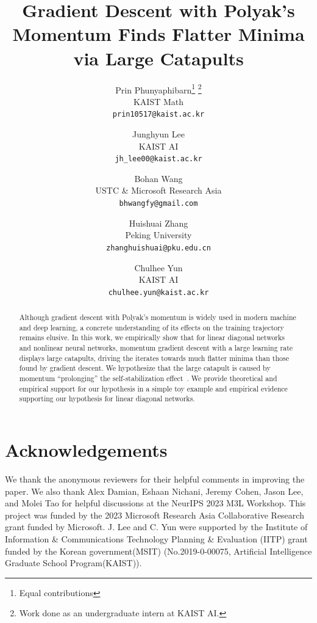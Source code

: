\documentclass{article}
\title{\textbf{Gradient Descent with Polyak's Momentum Finds Flatter Minima via Large Catapults}}
\date{}
\author{
  Prin Phunyaphibarn\thanks{Equal contributions} \thanks{Work done as an undergraduate intern at KAIST AI.} \\
  KAIST Math\\
  \texttt{\small prin10517@kaist.ac.kr} \\
  \and
  Junghyun Lee\footnotemark[1] \\
  KAIST AI\\
  \texttt{\small jh\_lee00@kaist.ac.kr} \\
  \and
  Bohan Wang \\
  USTC \& Microsoft Research Asia\\
  \texttt{\small bhwangfy@gmail.com} \\
  \and
  Huishuai Zhang \\
  Peking University \\
  \texttt{\small zhanghuishuai@pku.edu.cn} \\
  \and
  Chulhee Yun \\
  KAIST AI \\
  \texttt{\small chulhee.yun@kaist.ac.kr} \\
}
\theoremstyle{plain}
\begin{document}
\maketitle

\begin{abstract}
Although gradient descent with Polyak's momentum is widely used in modern machine and deep learning, a concrete understanding of its effects on the training trajectory remains elusive.
In this work, we empirically show that for linear diagonal networks and nonlinear neural networks, momentum gradient descent with a large learning rate displays large catapults, driving the iterates towards much flatter minima than those found by gradient descent.
We hypothesize that the large catapult is caused by momentum ``prolonging'' the self-stabilization effect~\citep{damian2023stabilization}.
We provide theoretical and empirical support for our hypothesis in a simple toy example and empirical evidence supporting our hypothesis for linear diagonal networks.
\end{abstract}












\section*{Acknowledgements}
We thank the anonymous reviewers for their helpful comments in improving the paper.
We also thank Alex Damian, Eshaan Nichani, Jeremy Cohen, Jason Lee, and Molei Tao for helpful discussions at the NeurIPS 2023 M3L Workshop.
This project was funded by the 2023 Microsoft Research Asia Collaborative Research grant funded by Microsoft.
J. Lee and C. Yun were supported by the Institute of Information \& Communications Technology Planning \& Evaluation (IITP) grant funded by the Korean government(MSIT) (No.2019-0-00075, Artificial Intelligence Graduate School Program(KAIST)).
\end{document}
